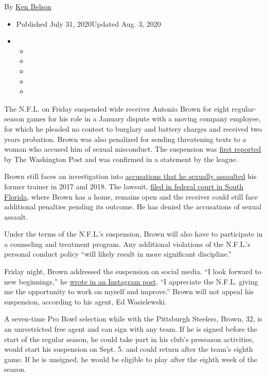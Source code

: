By \href{https://www.nytimes3xbfgragh.onion/by/ken-belson}{Ken Belson}

\begin{itemize}
\item
  Published July 31, 2020Updated Aug. 3, 2020
\item
  \begin{itemize}
  \item
  \item
  \item
  \item
  \item
  \end{itemize}
\end{itemize}

The N.F.L. on Friday suspended wide receiver Antonio Brown for eight
regular-season games for his role in a January dispute with a moving
company employee, for which he pleaded no contest to burglary and
battery charges and received two years probation. Brown was also
penalized for sending threatening texts to a woman who accused him of
sexual misconduct. The suspension was
\href{https://twitter.com/RobertKlemko/status/1289272211207929856}{first
reported} by The Washington Post and was confirmed in a statement by the
league.

Brown still faces an investigation into
\href{https://www.nytimes3xbfgragh.onion/2019/09/10/sports/football/antonio-brown-sexual-asssault-patriots.html}{accusations
that he sexually assaulted} his former trainer in 2017 and 2018. The
lawsuit,
\href{https://www.nytimes3xbfgragh.onion/2019/09/10/sports/football/antonio-brown-sexual-asssault-patriots.html}{filed
in federal court in South Florida}, where Brown has a home, remains open
and the receiver could still face additional penalties pending its
outcome. He has denied the accusations of sexual assault.

Under the terms of the N.F.L.'s suspension, Brown will also have to
participate in a counseling and treatment program. Any additional
violations of the N.F.L.'s personal conduct policy ``will likely result
in more significant discipline.''

Friday night, Brown addressed the suspension on social media. ``I look
forward to new beginnings,'' he
\href{https://www.instagram.com/p/CDVCrkeBb1w/}{wrote in an Instagram
post}. ``I appreciate the N.F.L. giving me the opportunity to work on
myself and improve.'' Brown will not appeal his suspension, according to
his agent, Ed Wasielewski.

A seven-time Pro Bowl selection while with the Pittsburgh Steelers,
Brown, 32, is an unrestricted free agent and can sign with any team. If
he is signed before the start of the regular season, he could take part
in his club's preseason activities, would start his suspension on Sept.
5. and could return after the team's eighth game. If he is unsigned, he
would be eligible to play after the eighth week of the season.

